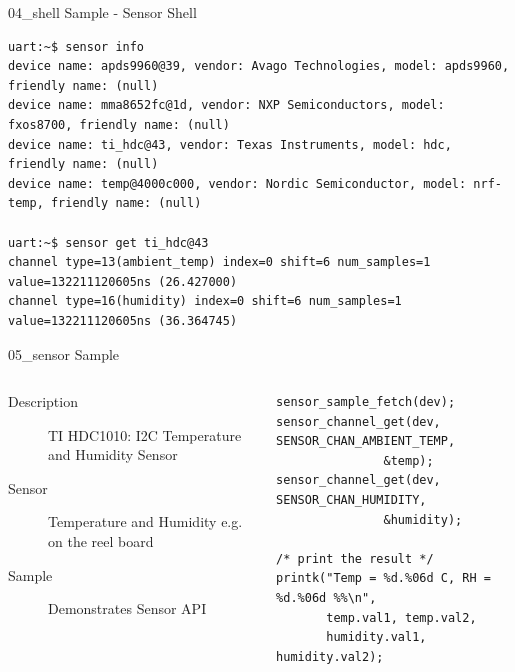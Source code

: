 \documentclass[10pt, aspectratio=169]{beamer}
\begin{document}
\begin{frame}[fragile]{04\_shell Sample - Sensor Shell}
  \begin{listing}[H]
    \begin{verbatim}
uart:~$ sensor info
device name: apds9960@39, vendor: Avago Technologies, model: apds9960, friendly name: (null)
device name: mma8652fc@1d, vendor: NXP Semiconductors, model: fxos8700, friendly name: (null)
device name: ti_hdc@43, vendor: Texas Instruments, model: hdc, friendly name: (null)
device name: temp@4000c000, vendor: Nordic Semiconductor, model: nrf-temp, friendly name: (null)

uart:~$ sensor get ti_hdc@43
channel type=13(ambient_temp) index=0 shift=6 num_samples=1 value=132211120605ns (26.427000)
channel type=16(humidity) index=0 shift=6 num_samples=1 value=132211120605ns (36.364745)
    \end{verbatim}
  \end{listing}
\end{frame}
\begin{frame}[fragile]{05\_sensor Sample}
  \begin{columns}
    \begin{column}{0.6\textwidth}
      \begin{description}
	\item [Description] TI HDC1010: I2C Temperature and Humidity Sensor \footnotemark
	\item [Sensor] Temperature and Humidity e.g. on the reel board
	\item [Sample] Demonstrates Sensor API
      \end{description}
    \end{column}
    \begin{column}{0.4\textwidth}
        {\fontsize{5}{5}\selectfont
  \begin{listing}[H]
    \begin{verbatim}
sensor_sample_fetch(dev);
sensor_channel_get(dev, SENSOR_CHAN_AMBIENT_TEMP,
	           &temp);
sensor_channel_get(dev, SENSOR_CHAN_HUMIDITY,
	           &humidity);

/* print the result */
printk("Temp = %d.%06d C, RH = %d.%06d %%\n",
       temp.val1, temp.val2,
       humidity.val1, humidity.val2);
    \end{verbatim}
    \caption{\scriptsize{Excerpt from samples/05\_sensor/src/main.c}}
  \end{listing}
        }
    \end{column}
  \end{columns}
\end{frame}
\end{document}
